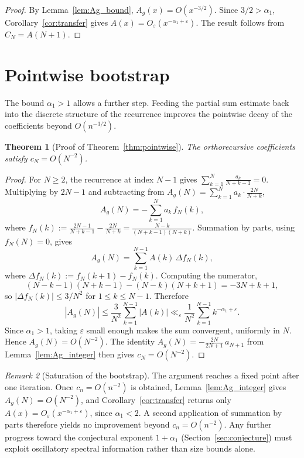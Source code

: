 \documentclass[11pt]{amsart}
\newtheorem{theorem}{Theorem}[section]
\theoremstyle{definition}
\theoremstyle{remark}
\newtheorem{remark}[theorem]{Remark}
\newcommand{\eps}{\varepsilon}
\begin{document}
\begin{proof}
By Lemma~\ref{lem:Ag_bound}, $A_g(x) = O(x^{-3/2})$. Since $3/2 > \alpha_1$, Corollary~\ref{cor:transfer} gives $A(x) = O_\eps(x^{-\alpha_1+\eps})$. The result follows from $C_N = A(N+1)$.
\end{proof}


\section{Pointwise bootstrap}\label{sec:bootstrap}

The bound $\alpha_1 > 1$ allows a further step. Feeding the partial sum estimate back into the discrete structure of the recurrence improves the pointwise decay of the coefficients beyond $O(n^{-3/2})$.

\begin{theorem}[Proof of Theorem~\ref{thm:pointwise}]\label{thm:bootstrap}
The orthorecursive coefficients satisfy $c_N = O(N^{-2})$.
\end{theorem}

\begin{proof}
For $N \geq 2$, the recurrence at index $N-1$ gives $\sum_{k=1}^{N} \frac{a_k}{N+k-1} = 0$. Multiplying by $2N-1$ and subtracting from $A_g(N) = \sum_{k=1}^{N} a_k \cdot \frac{2N}{N+k}$,
$$
A_g(N) = -\sum_{k=1}^{N} a_k\, f_N(k),
$$
where $f_N(k) := \frac{2N-1}{N+k-1} - \frac{2N}{N+k} = \frac{N-k}{(N+k-1)(N+k)}$. Summation by parts, using $f_N(N) = 0$, gives
$$
A_g(N) = \sum_{k=1}^{N-1} A(k)\, \Delta f_N(k),
$$
where $\Delta f_N(k) := f_N(k+1) - f_N(k)$. Computing the numerator,
$$
(N-k-1)(N+k-1) - (N-k)(N+k+1) = -3N + k + 1,
$$
so $|\Delta f_N(k)| \leq 3/N^2$ for $1 \leq k \leq N-1$. Therefore
$$
|A_g(N)| \leq \frac{3}{N^2} \sum_{k=1}^{N-1} |A(k)| \ll_\eps \frac{1}{N^2} \sum_{k=1}^{N-1} k^{-\alpha_1+\eps}.
$$
Since $\alpha_1 > 1$, taking $\eps$ small enough makes the sum convergent, uniformly in $N$. Hence $A_g(N) = O(N^{-2})$. The identity $A_g(N) = -\frac{2N}{2N+1}\, a_{N+1}$ from Lemma~\ref{lem:Ag_integer} then gives $c_N = O(N^{-2})$.
\end{proof}

\begin{remark}[Saturation of the bootstrap]\label{rem:saturation}
The argument reaches a fixed point after one iteration. Once $c_n = O(n^{-2})$ is obtained, Lemma~\ref{lem:Ag_integer} gives $A_g(N) = O(N^{-2})$, and Corollary~\ref{cor:transfer} returns only $A(x) = O_\eps(x^{-\alpha_1+\eps})$, since $\alpha_1 < 2$. A second application of summation by parts therefore yields no improvement beyond $c_n = O(n^{-2})$. Any further progress toward the conjectural exponent $1+\alpha_1$ (Section~\ref{sec:conjecture}) must exploit oscillatory spectral information rather than size bounds alone.
\end{remark}
\end{document}
